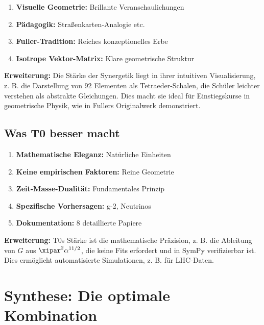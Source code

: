 	\begin{enumerate}
		\item \textbf{Visuelle Geometrie:} Brillante Veranschaulichungen
		\item \textbf{Pädagogik:} Straßenkarten-Analogie etc.
		\item \textbf{Fuller-Tradition:} Reiches konzeptionelles Erbe
		\item \textbf{Isotrope Vektor-Matrix:} Klare geometrische Struktur
	\end{enumerate}
	
	\textbf{Erweiterung:} Die Stärke der Synergetik liegt in ihrer intuitiven Visualisierung, z. B. die Darstellung von 92 Elementen als Tetraeder-Schalen, die Schüler leichter verstehen als abstrakte Gleichungen. Dies macht sie ideal für Einstiegskurse in geometrische Physik, wie in Fullers Originalwerk demonstriert.
	
	\subsection{Was T0 besser macht}
	
	\begin{enumerate}
		\item \textbf{Mathematische Eleganz:} Natürliche Einheiten
		\item \textbf{Keine empirischen Faktoren:} Reine Geometrie
		\item \textbf{Zeit-Masse-Dualität:} Fundamentales Prinzip
		\item \textbf{Spezifische Vorhersagen:} g-2, Neutrinos
		\item \textbf{Dokumentation:} 8 detaillierte Papiere
	\end{enumerate}
	
	\textbf{Erweiterung:} T0s Stärke ist die mathematische Präzision, z. B. die Ableitung von $G$ aus $\xipar^2 \alpha^{11/2}$, die keine Fits erfordert und in SymPy verifizierbar ist. Dies ermöglicht automatisierte Simulationen, z. B. für LHC-Daten.
	
	\section{Synthese: Die optimale Kombination}
	
